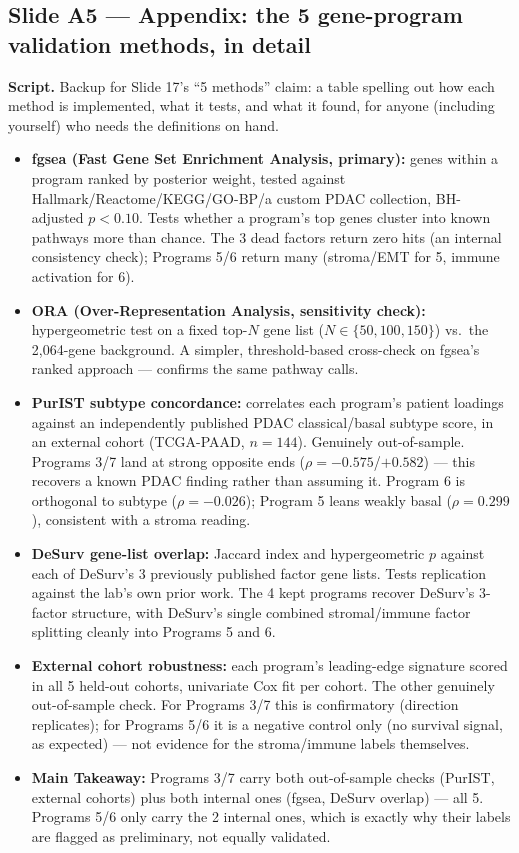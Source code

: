 \documentclass[11pt]{article}
\newcommand{\scriptlabel}{\textbf{Script. }}
\newcommand{\sectionlabel}[1]{\textbf{#1}}
\begin{document}
\subsection*{Slide A5 --- Appendix: the 5 gene-program validation methods, in detail}
\scriptlabel Backup for Slide 17's ``5 methods'' claim: a table spelling out how each method is
implemented, what it tests, and what it found, for anyone (including yourself) who needs the
definitions on hand.

\begin{itemize}
\item \sectionlabel{fgsea (Fast Gene Set Enrichment Analysis, primary):} genes within a program ranked by posterior weight, tested
against Hallmark/Reactome/KEGG/GO-BP/a custom PDAC collection, BH-adjusted $p<0.10$. Tests whether a
program's top genes cluster into known pathways more than chance. The 3 dead factors return zero
hits (an internal consistency check); Programs 5/6 return many (stroma/EMT for 5, immune activation
for 6).
\item \sectionlabel{ORA (Over-Representation Analysis, sensitivity check):} hypergeometric test on a fixed top-$N$ gene list
($N\in\{50,100,150\}$) vs.\ the 2,064-gene background. A simpler, threshold-based cross-check on
fgsea's ranked approach --- confirms the same pathway calls.
\item \sectionlabel{PurIST subtype concordance:} correlates each program's patient loadings against
an independently published PDAC classical/basal subtype score, in an external cohort (TCGA-PAAD,
$n=144$). Genuinely out-of-sample. Programs 3/7 land at strong opposite ends ($\rho=-0.575$/$+0.582$)
--- this recovers a known PDAC finding rather than assuming it. Program 6 is orthogonal to subtype
($\rho=-0.026$); Program 5 leans weakly basal ($\rho=0.299$), consistent with a stroma reading.
\item \sectionlabel{DeSurv gene-list overlap:} Jaccard index and hypergeometric $p$ against each of
DeSurv's 3 previously published factor gene lists. Tests replication against the lab's own prior
work. The 4 kept programs recover DeSurv's 3-factor structure, with DeSurv's single combined
stromal/immune factor splitting cleanly into Programs 5 and 6.
\item \sectionlabel{External cohort robustness:} each program's leading-edge signature scored in all
5 held-out cohorts, univariate Cox fit per cohort. The other genuinely out-of-sample check. For
Programs 3/7 this is confirmatory (direction replicates); for Programs 5/6 it is a negative control
only (no survival signal, as expected) --- not evidence for the stroma/immune labels themselves.
\item \sectionlabel{Main Takeaway:} Programs 3/7 carry both out-of-sample checks (PurIST, external
cohorts) plus both internal ones (fgsea, DeSurv overlap) --- all 5. Programs 5/6 only carry the 2
internal ones, which is exactly why their labels are flagged as preliminary, not equally validated.
\end{itemize}
\end{document}
